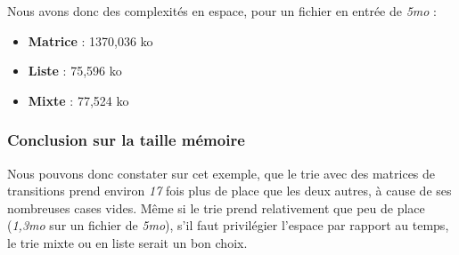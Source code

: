 Nous avons donc des complexités en espace, pour un fichier en entrée de \emph{5mo} :
\begin{itemize}
\item \textbf{Matrice} : 1370,036 ko
\item \textbf{Liste} : 75,596 ko
\item \textbf{Mixte} : 77,524 ko
\end{itemize}

\subsubsection*{Conclusion sur la taille mémoire}
Nous pouvons donc constater sur cet exemple, que le trie avec des matrices de
transitions prend environ \emph{17} fois plus de place que les deux autres, à cause de
ses nombreuses cases vides. Même si le trie prend relativement que peu de place
(\emph{1,3mo} sur un fichier de \emph{5mo}), s'il faut privilégier l'espace par rapport au temps,
le trie mixte ou en liste serait un bon choix.
